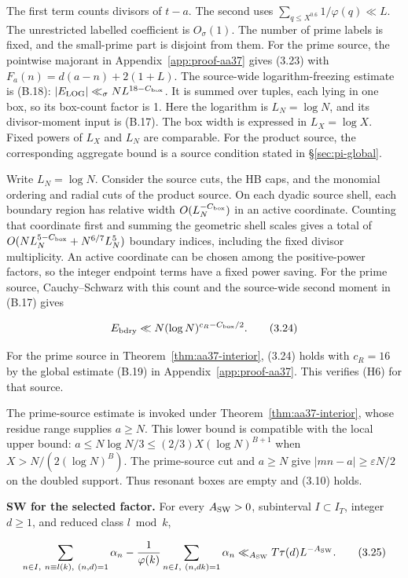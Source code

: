The first term counts divisors of $t-a$.
The second uses $\sum_{q\le X^{0.6}}1/\varphi(q)\ll L$.
The unrestricted labelled coefficient is $O_\sigma(1)$.
The number of prime labels is fixed,
and the small-prime part is disjoint from them.
For the prime source, the pointwise majorant in
Appendix~\ref{app:proof-aa37} gives (3.23) with
$F_a(n)=d(a-n)+2(1+L)$.
The source-wide logarithm-freezing estimate is (B.18):
$|E_{\rm LOG}|\ll_\sigma NL^{18-C_{\rm box}}$.
It is summed over tuples, each lying in one box, so its box-count
factor is 1. Here the logarithm is $L_N=\log N$, and its divisor-moment
input is (B.17). The box width is expressed in $L_X=\log X$.
Fixed powers of $L_X$ and $L_N$ are comparable.
For the product source, the corresponding aggregate bound is a
source condition stated in \S\ref{sec:pi-global}.

Write $L_N=\log N$. Consider the source cuts, the HB caps, and the monomial ordering and radial cuts of the product source.
On each dyadic source shell, each boundary region has relative width
$O(L_N^{-C_{\rm box}})$ in an active coordinate. Counting that
coordinate first and summing the geometric shell scales gives a total
of $O(NL_N^{5-C_{\rm box}}+N^{6/7}L_N^5)$ boundary indices, including
the fixed divisor multiplicity. An active coordinate can be chosen
among the positive-power factors, so the integer endpoint terms have a
fixed power saving. For the prime source, Cauchy--Schwarz with this
count and the source-wide second moment in (B.17) gives

\[
E_{\rm bdry}\ll N(\log N)^{c_R-C_{\rm box}/2}.
\tag{3.24}
\]

For the prime source in Theorem~\ref{thm:aa37-interior}, (3.24)
holds with $c_R=16$ by the global estimate (B.19) in
Appendix~\ref{app:proof-aa37}. This verifies (H6) for that source.

The prime-source estimate is invoked under
Theorem~\ref{thm:aa37-interior}, whose residue range supplies $a\ge N$.
This lower bound is compatible with the local upper bound:
$a\le N\log N/3\le(2/3)X(\log N)^{B+1}$ when
$X>N/(2(\log N)^B)$.
The prime-source cut and $a\ge N$ give
$|mn-a|\ge\varepsilon N/2$ on the doubled support.
Thus resonant boxes are empty and (3.10) holds.

\textbf{SW for the selected factor.} For every $A_{\rm SW}>0$, subinterval $I\subset I_T$,
integer $d\ge1$, and reduced class $l\bmod k$,

\[
\sum_{n\in I,\ n\equiv l(k),\ (n,d)=1}\alpha_n
 -\frac1{\varphi(k)}\sum_{n\in I,\ (n,dk)=1}\alpha_n
 \ll_{A_{\rm SW}} T\tau(d)L^{-A_{\rm SW}}.
\tag{3.25}
\]

